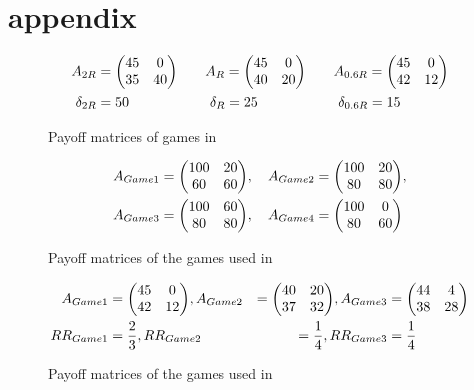 \documentclass[11pt]{article}
\begin{document}
\section{appendix}
\begin{figure}[h]
        \label{fig:payoffbattalio}
\caption{Payoff matrices of games in \textcite{battalio_optimization_2001}}
\begin{alignat*}{3}
        A_{2R} &= \mqty(45 & 0 \\ 35 & 40) \quad & &A_{R} = \mqty(45 & 0 \\ 
        40 & 20) \quad & &A_{0.6R} = \mqty( 45 & 0 \\ 42 & 12) \\
        \delta_{2R} &= 50  \quad & &\ \delta_{R} = 25 \quad & &\ \delta_{0.6R} = 15
\end{alignat*}
\end{figure}
\begin{figure}[H]
\label{fig:payoffschmidt}
\caption{Payoff matrices of the games used in \cite{schmidt_playing_2003}}
\begin{alignat*}{3}
        A_{Game1} = \mqty( 100 & 20 \\ 60 & 60), \quad A_{Game2} 
                               &= \mqty( 100 & 20 \\ 80 & 80), \\ 
        A_{Game3} = \mqty( 100 
             & 60 \\ 80 & 80), \quad A_{Game4} &= \mqty( 100
                             & 0 \\ 80 & 60)
        \end{alignat*}
\end{figure}
\begin{figure}[H]
        \caption{Payoff matrices of the games used
        in \cite{dubois_optimization_2012}}
        \label{fig:payoffdubois}
        \begin{alignat*}{3}     
                A_{Game1} &= \mqty(45 & 0 \\ 42 & 12),
                A_{Game2} &= \mqty(40 & 20 \\37 & 32),
                A_{Game3} &= \mqty(44 & 4 \\ 38 & 28) \\
                RR_{Game1}&= \frac 23, RR_{Game2}&=\frac 14, RR_{Game3}&=
                \frac 14
        \end{alignat*}
\end{figure}
\printbibliography
\end{document}
